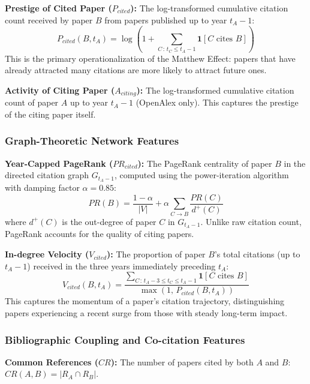 \documentclass[12pt,a4paper]{article}
\begin{document}
\textbf{Prestige of Cited Paper ($P_{cited}$):} The log-transformed cumulative
citation count received by paper $B$ from papers published up to year $t_A - 1$:
\begin{equation}
P_{cited}(B, t_A) = \log\!\left(1 + \sum_{C\,:\,t_C \le t_A - 1} \mathbf{1}[C \text{ cites } B]\right)
\end{equation}
This is the primary operationalization of the Matthew Effect: papers that have
already attracted many citations are more likely to attract future ones.

\textbf{Activity of Citing Paper ($A_{citing}$):} The log-transformed cumulative
citation count of paper $A$ up to year $t_A - 1$ (OpenAlex only). This captures
the prestige of the citing paper itself.

\subsubsection{Graph-Theoretic Network Features}

\textbf{Year-Capped PageRank ($PR_{cited}$):} The PageRank centrality of paper $B$
in the directed citation graph $G_{t_A - 1}$, computed using the power-iteration
algorithm with damping factor $\alpha = 0.85$:
\begin{equation}
PR(B) = \frac{1-\alpha}{|V|} + \alpha \sum_{C \to B} \frac{PR(C)}{d^+(C)}
\end{equation}
where $d^+(C)$ is the out-degree of paper $C$ in $G_{t_A - 1}$. Unlike raw
citation count, PageRank accounts for the quality of citing papers.

\textbf{In-degree Velocity ($V_{cited}$):} The proportion of paper $B$'s total
citations (up to $t_A - 1$) received in the three years immediately preceding $t_A$:
\begin{equation}
V_{cited}(B, t_A) = \frac{\sum_{C\,:\,t_A - 3 \le t_C \le t_A - 1} \mathbf{1}[C \text{ cites } B]}{\max\!\left(1,\, P_{cited}(B, t_A)\right)}
\end{equation}
This captures the momentum of a paper's citation trajectory, distinguishing papers
experiencing a recent surge from those with steady long-term impact.

\subsubsection{Bibliographic Coupling and Co-citation Features}

\textbf{Common References ($CR$):} The number of papers cited by both $A$ and $B$:
$CR(A, B) = |R_A \cap R_B|$.
\end{document}
